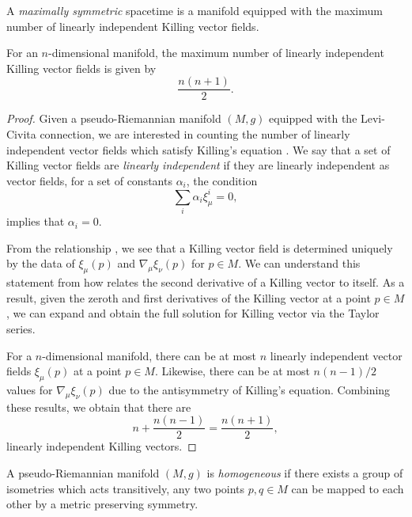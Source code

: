 \begin{defn}
	A \emph{maximally symmetric} spacetime is a manifold equipped with the maximum number of linearly independent Killing vector fields.
\end{defn}

\begin{prop}
	For an $n$-dimensional manifold, the maximum number of linearly independent Killing vector fields is given by
	\begin{equation*}
  		\frac{n(n+1)}{2}.
	\end{equation*}
\end{prop}

\begin{proof}
	Given a pseudo-Riemannian manifold $(M,g)$ equipped with the Levi-Civita connection, we are interested in counting the number of linearly independent vector fields which satisfy Killing's equation . We say that a set of Killing vector fields are \emph{linearly independent} if they are linearly independent as vector fields, \ie for a set of constants $\alpha_i$, the condition
	\begin{equation*}
		\sum_i \alpha_i \xi^i_\mu = 0,
	\end{equation*}
	implies that $\alpha_i = 0$.
	
	From the relationship , we see that a Killing vector field is determined uniquely by the data of $\xi_\mu(p)$ and $\nabla_\mu \xi_\nu(p)$ for $p \in M$. We can understand this statement from how  relates the second derivative of a Killing vector to itself. As a result, given the zeroth and first derivatives of the Killing vector at a point $p \in M$, we can expand and obtain the full solution for Killing vector via the Taylor series. 
	
	For a $n$-dimensional manifold, there can be at most $n$ linearly independent vector fields $\xi_\mu(p)$ at a point $p \in M$. Likewise, there can be at most $n(n-1)/2$ values for $\nabla_\mu \xi_\nu(p)$ due to the antisymmetry of Killing's equation. Combining these results, we obtain that there are 
		\begin{equation*}
  		n + \frac{n(n-1)}{2} = \frac{n(n+1)}{2},
		\end{equation*}
		linearly independent Killing vectors.
\end{proof}

\begin{defn}
	A pseudo-Riemannian manifold $(M,g)$ is \emph{homogeneous} if there exists a group of isometries which acts transitively, \ie any two points $p,q \in M$ can be mapped to each other by a metric preserving symmetry.
\end{defn}

